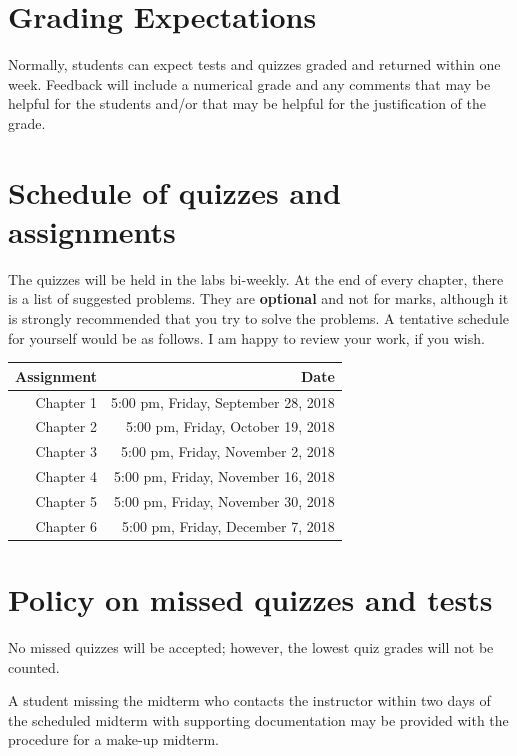 \documentclass[12pt]{article}
\begin{document}
\section{Grading Expectations}

Normally, students can expect tests and quizzes graded and returned within one week. Feedback will include a numerical grade and any comments that may be helpful for the students and/or that may be helpful for the justification of the grade.

\section{Schedule of quizzes and assignments}

The quizzes will be held in the labs bi-weekly. At the end of every chapter, there is a list of suggested problems. They are {\bf optional} and not for marks, although it is strongly recommended that you try to solve the problems. A tentative schedule for yourself would be as follows. I am happy to review your work, if you wish.

\begin{center}
\begin{tabular}[t]{rr}
\toprule
\textbf{Assignment} & \textbf{Date}\\
\midrule
Chapter 1 & 5:00 pm, Friday, September 28, 2018\\
Chapter 2 & 5:00 pm, Friday, October 19, 2018\\
Chapter 3 & 5:00 pm, Friday, November 2, 2018\\
Chapter 4 & 5:00 pm, Friday, November 16, 2018\\
Chapter 5 & 5:00 pm, Friday, November 30, 2018\\
Chapter 6 & 5:00 pm, Friday, December 7, 2018\\
\bottomrule
\end{tabular}
\end{center}

\section{Policy on missed quizzes and tests}

No missed quizzes will be accepted; however, the lowest quiz grades will not be counted.

A student missing the midterm who contacts the instructor within two days of the scheduled midterm with supporting documentation may be provided with the procedure for a make-up midterm.
\end{document}
